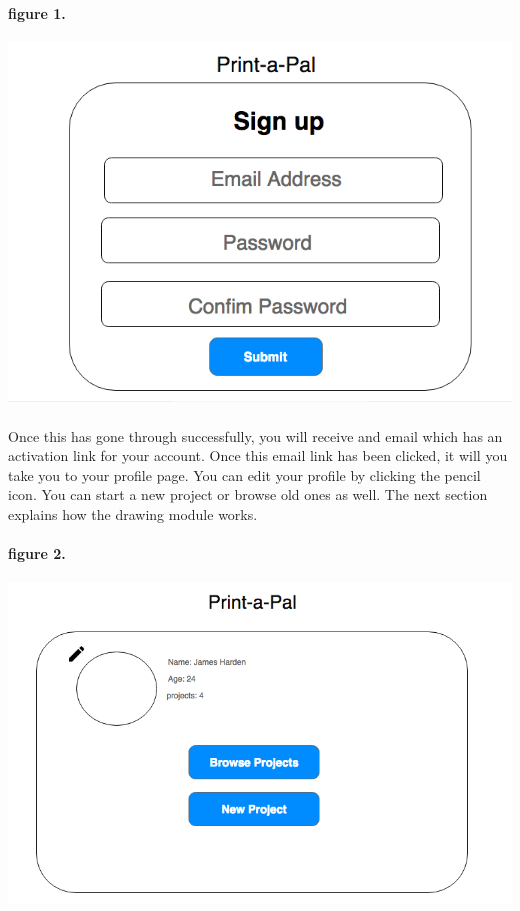 \documentclass{report}
\begin{document}
\paragraph{figure 1.}
\begin{center}
\includegraphics[width=\textwidth/2]{sign_up.png}
\end{center}

\paragraph{} Once this has gone through successfully, you will receive and email which has an activation link for your account. Once this email link has been clicked, it will you take you to your profile page. You can edit your profile by clicking the pencil icon. You can start a new project or browse old ones as well. The next section explains how the drawing module works. 
\paragraph{figure 2.}
\begin{center}
\includegraphics[width=\textwidth/2]{profile.png}
\end{center}
\end{document}
